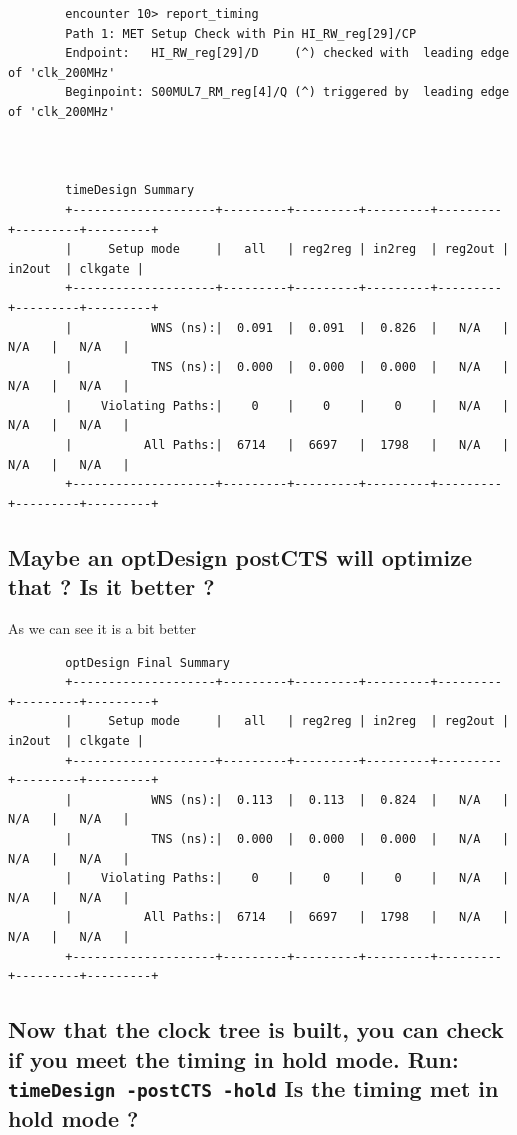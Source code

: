 \documentclass[11pt,a4paper,sans,dvipsnames]{report}
\begin{document}
	\begin{lstlisting}
		encounter 10> report_timing
		Path 1: MET Setup Check with Pin HI_RW_reg[29]/CP 
		Endpoint:   HI_RW_reg[29]/D     (^) checked with  leading edge of 'clk_200MHz'
		Beginpoint: S00MUL7_RM_reg[4]/Q (^) triggered by  leading edge of 'clk_200MHz'



		timeDesign Summary                             
		+--------------------+---------+---------+---------+---------+---------+---------+
		|     Setup mode     |   all   | reg2reg | in2reg  | reg2out | in2out  | clkgate |
		+--------------------+---------+---------+---------+---------+---------+---------+
		|           WNS (ns):|  0.091  |  0.091  |  0.826  |   N/A   |   N/A   |   N/A   |
		|           TNS (ns):|  0.000  |  0.000  |  0.000  |   N/A   |   N/A   |   N/A   |
		|    Violating Paths:|    0    |    0    |    0    |   N/A   |   N/A   |   N/A   |
		|          All Paths:|  6714   |  6697   |  1798   |   N/A   |   N/A   |   N/A   |
		+--------------------+---------+---------+---------+---------+---------+---------+
	\end{lstlisting}




	\subsection*{Maybe an optDesign postCTS will optimize that ? Is it better ?}

	As we can see it is a bit better
	\begin{lstlisting}
		optDesign Final Summary                             
		+--------------------+---------+---------+---------+---------+---------+---------+
		|     Setup mode     |   all   | reg2reg | in2reg  | reg2out | in2out  | clkgate |
		+--------------------+---------+---------+---------+---------+---------+---------+
		|           WNS (ns):|  0.113  |  0.113  |  0.824  |   N/A   |   N/A   |   N/A   |
		|           TNS (ns):|  0.000  |  0.000  |  0.000  |   N/A   |   N/A   |   N/A   |
		|    Violating Paths:|    0    |    0    |    0    |   N/A   |   N/A   |   N/A   |
		|          All Paths:|  6714   |  6697   |  1798   |   N/A   |   N/A   |   N/A   |
		+--------------------+---------+---------+---------+---------+---------+---------+
	\end{lstlisting}

	\subsection*{Now that the clock tree is built, you can check if you meet the timing in hold mode. Run: \texttt{timeDesign -postCTS -hold} Is the timing met in hold mode ?}
\end{document}
